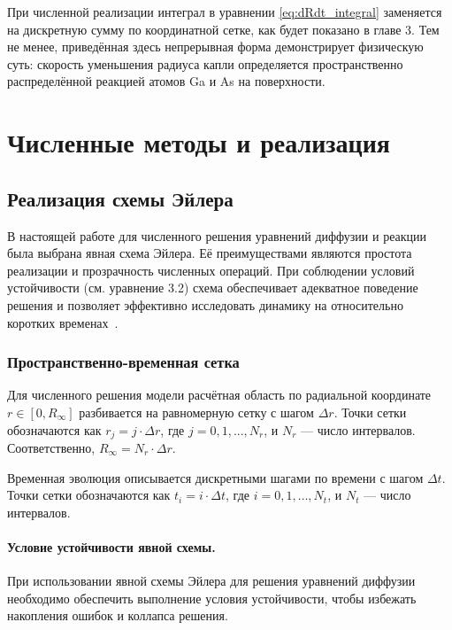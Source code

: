\documentclass[14pt,oneside]{extarticle}
\begin{document}
При численной реализации интеграл в уравнении \eqref{eq:dRdt_integral} заменяется на дискретную сумму по координатной сетке, как будет показано в главе 3. Тем не менее, приведённая здесь непрерывная форма демонстрирует физическую суть: скорость уменьшения радиуса капли определяется пространственно распределённой реакцией атомов Ga и As на поверхности.


\pagebreak
\section{Численные методы и реализация}

\subsection{Реализация схемы Эйлера}

В настоящей работе для численного решения уравнений диффузии и реакции была выбрана явная схема Эйлера. Её преимуществами являются простота реализации и прозрачность численных операций. При соблюдении условий устойчивости (см. уравнение 3.2) схема обеспечивает адекватное поведение решения и позволяет эффективно исследовать динамику на относительно коротких временах~\cite{usheva2014}.

\subsubsection{Пространственно-временная сетка}

Для численного решения модели расчётная область по радиальной координате \( r \in [0, R_\infty] \) разбивается на равномерную сетку с шагом \( \Delta r \). Точки сетки обозначаются как \( r_j = j \cdot \Delta r \), где \( j = 0, 1, ..., N_r \), и \( N_r \) — число интервалов. Соответственно, \( R_\infty = N_r \cdot \Delta r \).

Временная эволюция описывается дискретными шагами по времени с шагом \( \Delta t \). Точки сетки обозначаются как \( t_{i}=i\cdot\Delta t \), где \( i=0,1,\ldots,N_{t} \), и \( N_t \) — число интервалов. 

\paragraph{Условие устойчивости явной схемы.}

При использовании явной схемы Эйлера для решения уравнений диффузии необходимо обеспечить выполнение условия устойчивости, чтобы избежать накопления ошибок и коллапса решения.
\end{document}
